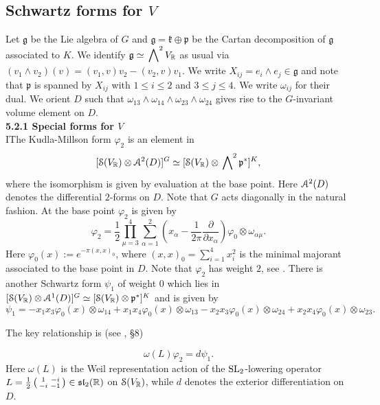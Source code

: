 \subsection{Schwartz forms for $V$}\label{V-forms}

Let $\mathfrak{g} $ be the Lie algebra of $G$ and $\mathfrak{g}= \mathfrak{k} \oplus \mathfrak{p}$ be the Cartan decomposition of $\mathfrak{g}$ associated to $K$.  We identify 
 $\mathfrak{g} \simeq \sideset{}{^{2}}\bigwedge V_{\mathbb{R}}$ as usual via $
(v_1 \wedge v_2)(v) = (v_1,v)v_2 - (v_2,v)v_1$. We write $X_{ij} = e_i \wedge e_j \in \mathfrak{g}$ and note that $\mathfrak{p}$ is spanned by $X_{ij}$ with $1 \leq i \leq 2$ and $3 \leq j \leq 4$. We write $\omega_{ij}$ for their dual. We orient $D$ such that $\omega_{13} \wedge \omega_{14} \wedge \omega_{23} \wedge \omega_{24}$ gives rise to the $G$-invariant volume element on $D$. 
\\[12pt] 
\textbf{5.2.1 Special forms for $V$} 
\\[10pt]
IThe Kudla-Millson form $\varphi_2$ is an element in 
\[
 [\mathcal{S}(V_{\mathbb{R}}) \otimes \mathcal{A}^2(D)]^G\simeq
[\mathcal{S}(V_{\mathbb{R}}) \otimes \sideset{}{^{2}}\bigwedge \mathfrak{p}^{\ast}]^K,
\]
where the isomorphism is given by evaluation at the base point. Here $\mathcal{A}^2(D)$ denotes the differential $2$-forms on $D$. Note that $G$ acts diagonally in the natural fashion. At the base point $\varphi_2$ is given by
\[
\varphi_2= \frac12 \prod_{\mu=3}^4 \sum_{\alpha=1}^{2}  \left( x_{\alpha} - \frac1{2\pi}\frac{\partial}{\partial x_{\alpha}} \right) \varphi_0 \otimes \omega_{\alpha\mu}.
\]
Here $\varphi_0(x) := e^{-\pi(x,x)_{0}}$, where $(x,x)_0= \sum_{i=1}^4 x_i^2$ is the minimal majorant associated to the base point in $D$. Note that $\varphi_2$ has weight $2$, see \cite{KM1}. There is another Schwartz form $\psi_1$ of weight $0$ which lies in $
[\mathcal{S}(V_{\mathbb{R}}) \otimes \mathcal{A}^1(D)]^G\simeq
[\mathcal{S}(V_{\mathbb{R}}) \otimes \mathfrak{p}^{\ast}]^K$ and is given by
\begin{equation}\label{psi20}
\psi_1 =  -x_1x_3\varphi_0(x) \otimes \omega_{14}+x_1x_4  \varphi_0(x) \otimes \omega_{13} - x_2x_3 \varphi_0(x) \otimes \omega_{24}+x_2x_4\varphi_0(x) \otimes \omega_{23}. 
\end{equation}


The key relationship is (see \cite{KM90}, \S 8)

\begin{theorem}\label{localholomorphic1}
\[
\omega(L) \varphi_2 = d \psi_1.
\]
Here $\omega(L)$ is the Weil representation action
of the $\operatorname{SL}_2$-lowering operator $L = \tfrac12 \left(
\begin{smallmatrix}1 & -i \\ -i & -1\end{smallmatrix} \right)  \in \mathfrak{sl}_2(\mathbb{R})$ on
$\mathcal{S}(V_{\mathbb{R}})$, while $d$ denotes the exterior differentiation on $D$. 
\end{theorem}

